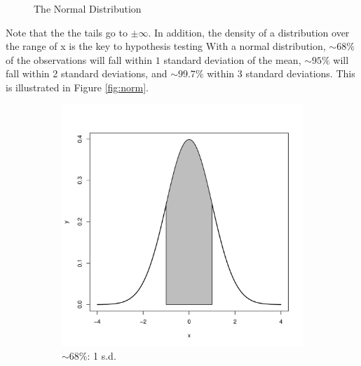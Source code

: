 \documentclass[11pt,openany]{book}\usepackage[]{graphicx}\usepackage[]{color}
\begin{document}
{\begin{figure}
  \caption[Normal Distribution]{The Normal Distribution  \label{normal}}
\end{figure}
\noindent Note that the the tails go to $\pm \infty$. In addition, the density of a distribution over the range of x is the key to hypothesis testing With a normal distribution, $\sim68\%$ of the observations will fall within $1$ standard deviation of the mean, $\sim 95\%$ will fall within 2 standard deviations, and $\sim 99.7\%$ within 3 standard deviations. This is illustrated in Figure \ref{fig:norm}. 





\begin{figure}
        \centering
        \begin{subfigure}[b]{0.4\textwidth}
                \centering
                \includegraphics[width=\textwidth]{05_Inference/normal68.pdf}
                \caption{$\sim 68\%$: 1 s.d. \label{fig:norm68}}
        \end{subfigure}
        \begin{subfigure}[b]{0.4\textwidth}
                \centering

\end{subfigure}
\end{figure}}
\end{document}
